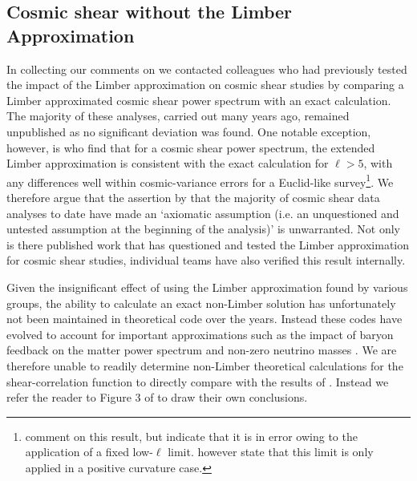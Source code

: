  \subsection{Cosmic shear without the Limber Approximation}
In collecting our comments on \citet{kitching/etal:2016} we contacted colleagues who had previously tested the impact of the Limber approximation on cosmic shear studies by comparing a Limber approximated cosmic shear power spectrum with an exact calculation.  The majority of these analyses, carried out many years ago, remained unpublished as no significant deviation was found.  One notable exception, however, is \citet{giannantonio/etal:2012} who find that for a cosmic shear power spectrum, the extended Limber approximation is consistent with the exact calculation for $\ell>5$, with any differences well within cosmic-variance errors for a Euclid-like survey\footnote{\citet{kitching/etal:2016} comment on this result, but indicate that it is in error owing to the application of a fixed low-$\ell$ limit.  \citet{giannantonio/etal:2012} however state that this limit is only applied in a positive curvature case.}.  We therefore argue that the assertion by \citet{kitching/etal:2016} that the majority of cosmic shear data analyses to date have made an `axiomatic assumption (i.e. an unquestioned and untested assumption at the beginning of the analysis)'  is unwarranted.  Not only is there published work that has questioned and tested the Limber approximation for cosmic shear studies, individual teams have also verified this result internally.    

Given the insignificant effect of using the Limber approximation found by various groups, the ability to calculate an exact non-Limber solution has unfortunately not been maintained in theoretical code over the years.  Instead these codes have evolved to account for important approximations such as the impact of baryon feedback on the matter power spectrum and non-zero neutrino masses \citep[see for example][]{joudaki/etal:2016, mead/etal:2016}.    We are therefore unable to readily determine non-Limber theoretical calculations for the shear-correlation function to directly compare with the results of \citet{kitching/etal:2016}.   Instead we refer the reader to Figure 3 of \citet{giannantonio/etal:2012} to draw their own conclusions.



 
 
 
 
 
 
 